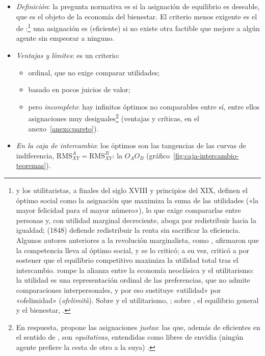 \documentclass[11pt]{article}
\begin{document}
\begin{itemize}
\item \emph{Definición}: la pregunta normativa es si la asignación de equilibrio es deseable, que es el objeto de la economía del bienestar. El criterio menos exigente es el de \textcite{Pareto1906Manuale}:\footnote{ y los utilitaristas, a finales del siglo XVIII y principios del XIX, definen el óptimo social como la asignación que maximiza la suma de las utilidades («la mayor felicidad para el mayor número»), lo que exige compararlas entre personas y, con utilidad marginal decreciente, aboga por redistribuir hacia la igualdad;  (1848) defiende redistribuir la renta sin sacrificar la eficiencia. Algunos autores anteriores a la revolución marginalista, como , afirmaron que la competencia lleva al óptimo social, y  se lo criticó; a su vez,  criticó a  por sostener que el equilibrio competitivo maximiza la utilidad total tras el intercambio.  rompe la alianza entre la economía neoclásica y el utilitarismo: la utilidad es una representación ordinal de las preferencias, que no admite comparaciones interpersonales, y por eso sustituye «utilidad» por «ofelimidad» (\emph{ofelimità}). Sobre  y el utilitarismo, \textcite[cap.~6]{EkelundHebert2013History}; sobre , el equilibrio general y el bienestar, \textcite[cap.~17]{EkelundHebert2013History}.} una asignación es  (eficiente) si no existe otra factible que mejore a algún agente sin empeorar a ninguno.
\item \emph{Ventajas y límites}: es un criterio:
  \begin{itemize}
  \item ordinal, que no exige comparar utilidades;
  \item basado en pocos juicios de valor;
  \item pero \emph{incompleto}: hay infinitos óptimos no comparables entre sí, entre ellos asignaciones muy desiguales\footnote{En respuesta, \textcite{Foley1967Resource} propone las asignaciones \emph{justas}: las que, además de eficientes en el sentido de , son \emph{equitativas}, entendidas como libres de envidia (ningún agente prefiere la cesta de otro a la suya) .}   (ventajas y críticas, en el anexo~\ref{anexo:pareto}).
  \end{itemize}
\item \emph{En la caja de intercambio}: los óptimos son las tangencias de las curvas de indiferencia, $\mathrm{RMS}^A_{XY}=\mathrm{RMS}^B_{XY}$: la  $O_AO_B$ (gráfico~\ref{fig:caja-intercambio-teoremas}).
\end{itemize}
\end{document}
